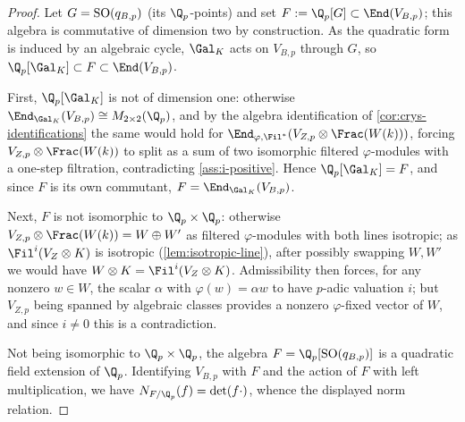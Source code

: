 \begin{proof}
  Let \(G = \mathrm{SO}(q_{B,p})\) (its \(\Q_p\)-points) and set \(F := \Q_p[G] \subset
  \End(V_{B,p})\); this algebra is commutative of dimension two by construction.
  As the quadratic form is induced by an algebraic cycle, \(\Gal_K\) acts on
  \(V_{B,p}\) through \(G\), so
  \(\Q_p[\Gal_K] \subset F \subset \End(V_{B,p})\).

  First, \(\Q_p[\Gal_K]\) is not of dimension one: otherwise
  \(\End_{\Gal_K}(V_{B,p}) \cong M_{2\times 2}(\Q_p)\), and by the algebra
  identification of \cref{cor:crys-identifications} the same would hold for
  \(\End_{\varphi,\Fil^*}(V_{Z,p} \otimes \Frac(W(k)))\), forcing
  \(V_{Z,p} \otimes \Frac(W(k))\) to split as a sum of two isomorphic filtered
  \(\varphi\)-modules with a one-step filtration, contradicting
  \cref{ass:i-positive}. Hence \(\Q_p[\Gal_K] = F\), and since \(F\) is its own
  commutant, \(F = \End_{\Gal_K}(V_{B,p})\).

  Next, \(F\) is not isomorphic to \(\Q_p \times \Q_p\): otherwise
  \(V_{Z,p} \otimes \Frac(W(k)) = W \oplus W'\) as filtered \(\varphi\)-modules
  with both lines isotropic; as \(\Fil^i(V_Z \otimes K)\) is isotropic
  (\cref{lem:isotropic-line}), after possibly swapping \(W, W'\) we would have
  \(W \otimes K = \Fil^i(V_Z \otimes K)\). Admissibility then forces, for any
  nonzero \(w \in W\), the scalar \(\alpha\) with \(\varphi(w) = \alpha w\) to
  have \(p\)-adic valuation \(i\); but \(V_{Z,p}\) being spanned by algebraic
  classes provides a nonzero \(\varphi\)-fixed vector of \(W\), and since
  \(i \neq 0\) this is a contradiction.

  Not being isomorphic to \(\Q_p \times \Q_p\), the algebra \(F = \Q_p[\SO(q_{B,p})]\)
  is a quadratic field extension of \(\Q_p\). Identifying \(V_{B,p}\) with \(F\)
  and the action of \(F\) with left multiplication, we have
  \(N_{F/\Q_p}(f) = \det(f \cdot)\), whence the displayed norm relation.
\end{proof}

